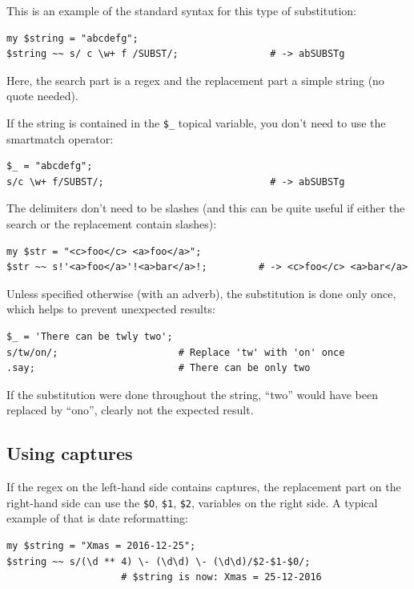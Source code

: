 This is an example of the standard syntax for this type 
of substitution:

\begin{verbatim}
my $string = "abcdefg";
$string ~~ s/ c \w+ f /SUBST/;                # -> abSUBSTg
\end{verbatim}

Here, the search part is a regex and the replacement part a simple string (no quote needed).

If the string is contained in the \verb'$_' topical variable,
you don't  need to use the smartmatch operator:

\begin{verbatim}
$_ = "abcdefg";
s/c \w+ f/SUBST/;                             # -> abSUBSTg
\end{verbatim}
%

The delimiters don't need to be slashes (and this can be quite 
useful if either the search or the replacement contain slashes):

\begin{verbatim}
my $str = "<c>foo</c> <a>foo</a>";
$str ~~ s!'<a>foo</a>'!<a>bar</a>!;         # -> <c>foo</c> <a>bar</a>
\end{verbatim}
%

Unless specified otherwise (with an adverb), the substitution 
is done only once, which helps to prevent unexpected results:

\begin{verbatim}
$_ = 'There can be twly two';
s/tw/on/;                     # Replace 'tw' with 'on' once
.say;                         # There can be only two
\end{verbatim}
%
If the substitution were done throughout the string, ``two'' 
would have been replaced by ``ono'', clearly not the expected 
result.

\subsection{Using captures}

If the regex on the left-hand side contains captures, the 
replacement part on the right-hand side can use the \verb'$O', 
\verb'$1', \verb'$2', variables on the right side. A typical 
example of that is date reformatting:

\begin{verbatim}
my $string = "Xmas = 2016-12-25";
$string ~~ s/(\d ** 4) \- (\d\d) \- (\d\d)/$2-$1-$0/;
                    # $string is now: Xmas = 25-12-2016
\end{verbatim}
%

